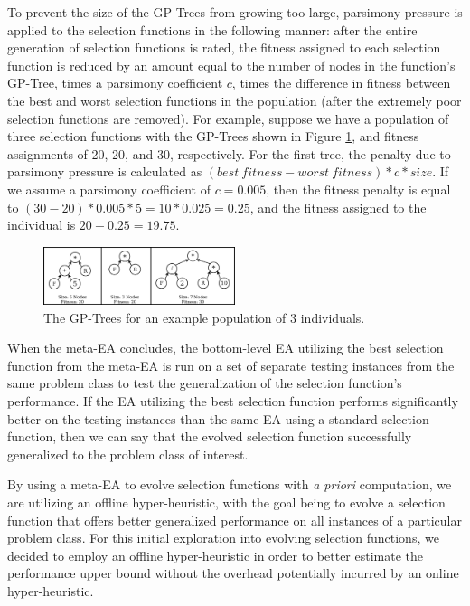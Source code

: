 \documentclass[sigconf]{acmart}
\begin{document}
To prevent the size of the GP-Trees from growing too large, parsimony pressure is applied to the selection functions in the following manner: after the entire generation of selection functions is rated, the fitness assigned to each selection function is reduced by an amount equal to the number of nodes in the function's GP-Tree, times a parsimony coefficient $c$, times the difference in fitness between the best and worst selection functions in the population (after the extremely poor selection functions are removed). For example, suppose we have a population of three selection functions with the GP-Trees shown in Figure \ref{fig:parsimony_example}, and fitness assignments of 20, 20, and 30, respectively. For the first tree, the penalty due to parsimony pressure is calculated as $(best\ fitness - worst\ fitness) * c * size$. If we assume a parsimony coefficient of $c = 0.005$, then the fitness penalty is equal to $(30 - 20) * 0.005 * 5 = 10 * 0.025 = 0.25$, and the fitness assigned to the individual is $20 - 0.25 = 19.75$.

\begin{figure}
	\centering
	\includegraphics[width=0.5\textwidth]{parsimony_example}
	\caption{The GP-Trees for an example population of 3 individuals.}
	\label{fig:parsimony_example}
\end{figure}

When the meta-EA concludes, the bottom-level EA utilizing the best selection function from the meta-EA is run on a set of separate testing instances from the same problem class to test the generalization of the selection function's performance. If the EA utilizing the best selection function performs significantly better on the testing instances than the same EA using a standard selection function, then we can say that the evolved selection function successfully generalized to the problem class of interest. 

By using a meta-EA to evolve selection functions with \textit{a priori} computation, we are utilizing an offline hyper-heuristic, with the goal being to evolve a selection function that offers better generalized performance on all instances of a particular problem class. For this initial exploration into evolving selection functions, we decided to employ an offline hyper-heuristic in order to better estimate the performance upper bound without the overhead potentially incurred by an online hyper-heuristic.
\end{document}
